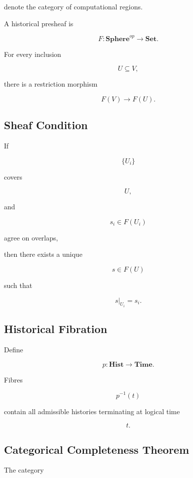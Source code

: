 \documentclass[12pt,oneside]{article}
\theoremstyle{definition}
\theoremstyle{remark}
\begin{document}
denote the category of computational regions.

A historical presheaf is

\[
F
:
\mathbf{Sphere}^{op}
\rightarrow
\mathbf{Set}.
\]

For every inclusion

\[
U
\subseteq
V,
\]

there is a restriction morphism

\[
F(V)
\rightarrow
F(U).
\]

\subsection*{Sheaf Condition}

If

\[
\{U_i\}
\]

covers

\[
U,
\]

and

\[
s_i
\in
F(U_i)
\]

agree on overlaps,

then there exists a unique

\[
s
\in
F(U)
\]

such that

\[
s|_{U_i}=s_i.
\]

\subsection*{Historical Fibration}

Define

\[
p
:
\mathbf{Hist}
\rightarrow
\mathbf{Time}.
\]

Fibres

\[
p^{-1}(t)
\]

contain all admissible histories terminating at logical time

\[
t.
\]

\subsection*{Categorical Completeness Theorem}

The category
\end{document}
